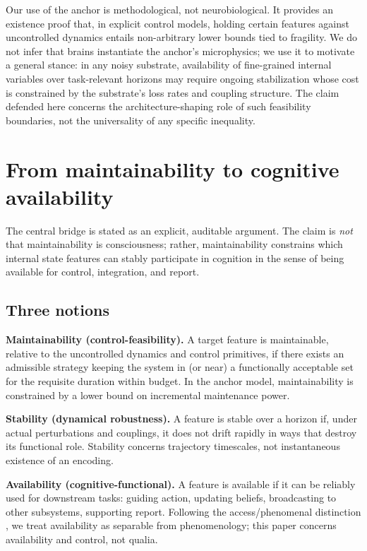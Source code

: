 \documentclass[11pt,a4paper]{article}
\begin{document}
Our use of the anchor is methodological, not neurobiological. It provides an
existence proof that, in explicit control models, holding certain features
against uncontrolled dynamics entails non-arbitrary lower bounds tied to
fragility. We do not infer that brains instantiate the anchor's microphysics;
we use it to motivate a general stance: in any noisy substrate, availability
of fine-grained internal variables over task-relevant horizons may require
ongoing stabilization whose cost is constrained by the substrate's loss rates
and coupling structure. The claim defended here concerns the
architecture-shaping role of such feasibility boundaries, not the
universality of any specific inequality.

\section{From maintainability to cognitive availability}

The central bridge is stated as an explicit, auditable argument. The claim is
\emph{not} that maintainability is consciousness; rather, maintainability
constrains which internal state features can stably participate in cognition
in the sense of being available for control, integration, and report.

\subsection{Three notions}

\textbf{Maintainability (control-feasibility).} A target feature is
maintainable, relative to the uncontrolled dynamics and control primitives, if
there exists an admissible strategy keeping the system in (or near) a
functionally acceptable set for the requisite duration within budget. In the
anchor model, maintainability is constrained by a lower bound on incremental
maintenance power.

\textbf{Stability (dynamical robustness).} A feature is stable over a horizon
if, under actual perturbations and couplings, it does not drift rapidly in
ways that destroy its functional role. Stability concerns trajectory
timescales, not instantaneous existence of an encoding.

\textbf{Availability (cognitive-functional).} A feature is available if it can
be reliably used for downstream tasks: guiding action, updating beliefs,
broadcasting to other subsystems, supporting report. Following the
access/phenomenal distinction \cite{Block95,DehaeneNaccache01}, we treat
availability as separable from phenomenology; this paper concerns availability
and control, not qualia.
\end{document}
